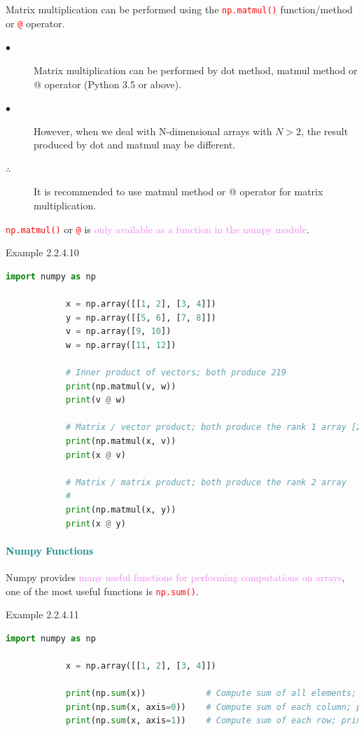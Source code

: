 \documentclass{book}
\begin{document}
Matrix multiplication can be performed using the \textcolor{red}{\texttt{np.matmul()}} function/method or \textcolor{red}{\texttt{@}} operator.\\
\begin{description}
    \item[$\bullet$] Matrix multiplication can be performed by dot method, matmul method or @ operator (Python 3.5 or above).
    \item[$\bullet$] However, when we deal with N-dimensional arrays with \(N>2\), the result produced by dot and matmul may be different.
    \item[$\therefore$] It is recommended to use matmul method or @ operator for matrix multiplication.
\end{description}
\newpage
\textcolor{red}{\texttt{np.matmul()}} or \textcolor{red}{\texttt{@}} is \textcolor{violet}{only available as a function in the numpy module}.
\begin{egBox}{Example 2.2.4.10}{}
    \begin{lstlisting}[language=Python, basicstyle=\ttfamily\small, keywordstyle=\color{blue}, commentstyle=\color{forestgreen}, stringstyle=\color{red}, showstringspaces=false]
            import numpy as np

            x = np.array([[1, 2], [3, 4]])
            y = np.array([[5, 6], [7, 8]])
            v = np.array([9, 10])
            w = np.array([11, 12])

            # Inner product of vectors; both produce 219
            print(np.matmul(v, w))
            print(v @ w)

            # Matrix / vector product; both produce the rank 1 array [29 67]
            print(np.matmul(x, v))
            print(x @ v)

            # Matrix / matrix product; both produce the rank 2 array    [[19 22]
            #                                                             [43 50]]
            print(np.matmul(x, y))
            print(x @ y)            
    \end{lstlisting}
\end{egBox}
\textcolor{teal}{\paragraph{Numpy Functions}}
Numpy provides \textcolor{violet}{many useful functions for performing computations on arrays}, one of the most useful functions is \textcolor{red}{\texttt{np.sum()}}.
\begin{egBox}{Example 2.2.4.11}{}
    \begin{lstlisting}[language=Python, basicstyle=\ttfamily\small, keywordstyle=\color{blue}, commentstyle=\color{forestgreen}, stringstyle=\color{red}, showstringspaces=false]
            import numpy as np

            x = np.array([[1, 2], [3, 4]])

            print(np.sum(x))            # Compute sum of all elements; prints "10"
            print(np.sum(x, axis=0))    # Compute sum of each column; prints "[4 6]"
            print(np.sum(x, axis=1))    # Compute sum of each row; prints "[3 7]"
    \end{lstlisting}
\end{egBox}
\end{document}
